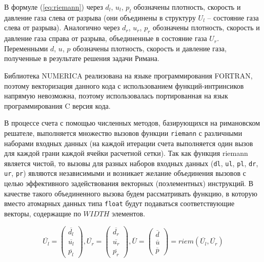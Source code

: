 \documentclass[
11pt,%
tightenlines,%
twoside,%
onecolumn,%
nofloats,%
nobibnotes,%
nofootinbib,%
superscriptaddress,%
noshowpacs,%
centertags]%
{revtex4}
\begin{document}
В формуле (\ref{eq:riemann}) через $d_l$, $u_l$, $p_l$ обозначены плотность, скорость и давление газа слева от разрыва (они объединены в структуру  $U_l$ -- состояние газа слева от разрыва).
Аналогично через $d_r$, $u_r$, $p_r$ обозначены плотность, скорость и давление газа справа от разрыва, объединенные в состояние газа $U_r$.
Переменными $d$, $u$, $p$ обозначены плотность, скорость и давление газа, полученные в результате решения задачи Римана.

Библиотека NUMERICA реализована на языке программирования FORTRAN, поэтому векторизация данного кода с использованием функций-интринсиков напрямую невозможна, поэтому использовалась портированная на язык программирования C версия кода.

В процессе счета с помощью численных методов, базирующихся на римановском решателе, выполняется множество вызовов функции \texttt{riemann} с различными наборами входных данных (на каждой итерации счета выполняется один вызов для каждой грани каждой ячейки расчетной сетки).
Так как функция riemann является чистой, то вызовы для разных наборов входных данных (\texttt{dl}, \texttt{ul}, \texttt{pl}, \texttt{dr}, \texttt{ur}, \texttt{pr}) являются независимыми и возникает желание объединения вызовов с целью эффективного задействования векторных (поэлементных) инструкций.
В качестве такого объединенного вызова будем рассматривать функцию, в которую вместо атомарных данных типа \texttt{float} будут подаваться соответствующие векторы, содержащие по $WIDTH$ элементов.

\begin{equation}\label{eq:riemann_16}
\overline{U_l} = \left( \begin{array}{ccc} \overline{d_l} \\ \overline{u_l} \\ \overline{p_l} \end{array} \right),
\overline{U_r} = \left( \begin{array}{ccc} \overline{d_r} \\ \overline{u_r} \\ \overline{p_r} \end{array} \right),
\overline{U} = \left( \begin{array}{ccc} \overline{d} \\ \overline{u} \\ \overline{p} \end{array} \right) = riem(\overline{U_l}, \overline{U_r})
\end{equation}
\end{document}
